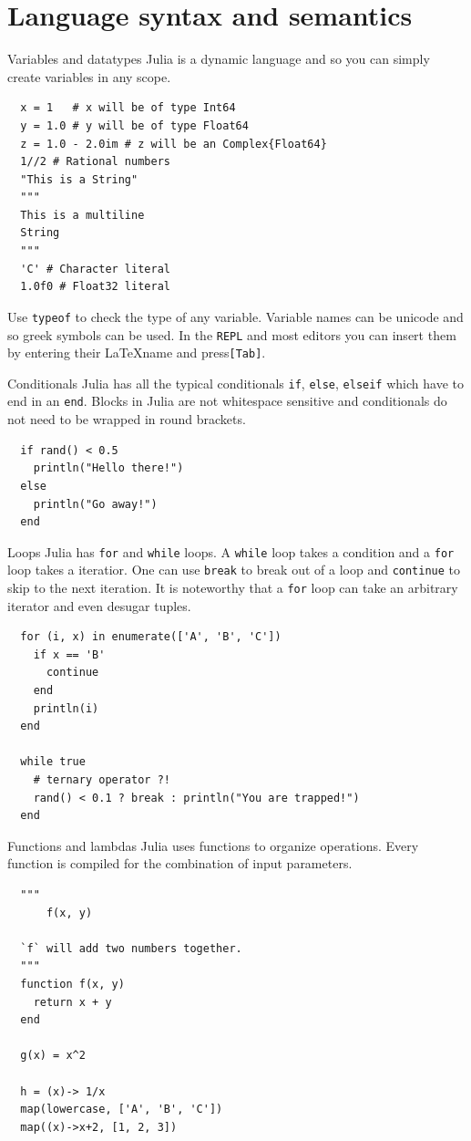 \documentclass{beamer}
\begin{document}
\section{Language syntax and semantics}
\begin{frame}[fragile]{Variables and datatypes}
  Julia is a dynamic language and so you can simply create variables in any scope.
  \begin{lstlisting}
  x = 1   # x will be of type Int64
  y = 1.0 # y will be of type Float64
  z = 1.0 - 2.0im # z will be an Complex{Float64}
  1//2 # Rational numbers
  "This is a String"
  """
  This is a multiline
  String
  """
  'C' # Character literal
  1.0f0 # Float32 literal
  \end{lstlisting}
  Use \verb|typeof| to check the type of any variable. Variable names can be unicode and so greek symbols can be used.
  In the \verb|REPL| and most editors you can insert them by entering their \LaTeX name and press\verb|[Tab]|.
\end{frame}
\begin{frame}[fragile]{Conditionals}
  Julia has all the typical conditionals \verb|if|, \verb|else|, \verb|elseif| which have to end in an \verb|end|.
  Blocks in Julia are not whitespace sensitive and conditionals do not need to be wrapped in round brackets.

  \begin{lstlisting}
  if rand() < 0.5
    println("Hello there!")
  else
    println("Go away!")
  end
  \end{lstlisting}

\end{frame}
\begin{frame}[fragile]{Loops}
  Julia has \verb|for| and \verb|while| loops. A \verb|while| loop takes a condition and a \verb|for| loop takes a iteratior.
  One can use \verb|break| to break out of a loop and \verb|continue| to skip to the next iteration. It is noteworthy that a \verb|for| loop can take an arbitrary iterator and even desugar tuples.
  \begin{lstlisting}
  for (i, x) in enumerate(['A', 'B', 'C'])
    if x == 'B'
      continue
    end
    println(i)
  end

  while true
    # ternary operator ?!
    rand() < 0.1 ? break : println("You are trapped!")
  end
  \end{lstlisting}
\end{frame}
\begin{frame}[fragile]{Functions and lambdas}
  Julia uses functions to organize operations. Every function is compiled for the combination of input parameters.
  \begin{lstlisting}
  """
      f(x, y)

  `f` will add two numbers together.
  """
  function f(x, y)
    return x + y
  end

  g(x) = x^2

  h = (x)-> 1/x
  map(lowercase, ['A', 'B', 'C'])
  map((x)->x+2, [1, 2, 3])
  \end{lstlisting}
\end{frame}
\end{document}
